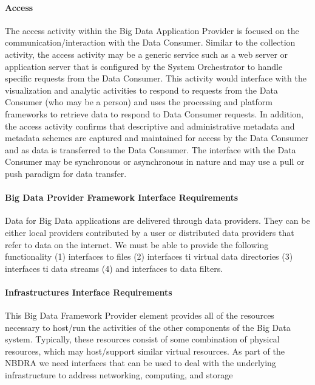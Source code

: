\documentclass[10pt]{article}
\begin{document}
\paragraph{Access}

The access activity within the Big Data Application Provider is focused on the communication/interaction with the Data Consumer. Similar to the collection activity, the access activity may be a generic service such as a web server or application server that is configured by the System Orchestrator to handle specific requests from the Data Consumer. This activity would interface with the visualization and analytic activities to respond to requests from the Data Consumer (who may be a person) and uses the processing and platform frameworks to retrieve data to respond to Data Consumer requests. In addition, the access activity confirms that descriptive and administrative metadata and metadata schemes are captured and maintained for access by the Data Consumer and as data is transferred to the Data Consumer. The interface with the Data Consumer may be synchronous or asynchronous in nature and may use a pull or push paradigm for data transfer. 

\paragraph{Big Data Provider Framework Interface Requirements}

Data for Big Data applications are delivered through data providers. They can be either local providers contributed by a user or distributed data providers that refer to data on the internet.  We must be able to provide the following functionality (1) interfaces to files (2) interfaces ti virtual data directories (3) interfaces ti data streams (4) and interfaces to data filters.

\paragraph{Infrastructures Interface Requirements}

This Big Data Framework Provider element provides all of the resources necessary to host/run the activities of the other components of the Big Data system. Typically, these resources consist of some combination of physical resources, which may host/support similar virtual resources.
As part of the NBDRA we need interfaces that can be used to deal with the underlying infrastructure to address networking, computing, and storage
\end{document}
